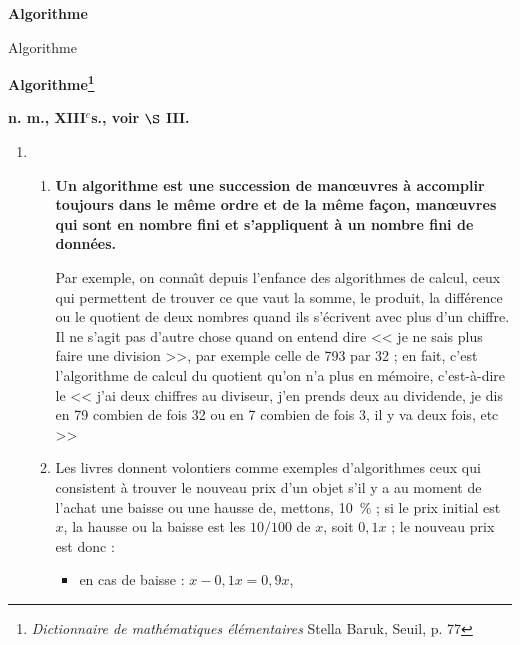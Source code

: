 \centerline{\Large\bf Algorithme} 
\addtocounter{section}{1}
 {Algorithme}
\label{Algo}

\noindent\hrulefill


{\Large \bf Algorithme\footnote{{\it Dictionnaire de math\'ematiques
\'el\'ementaires} Stella Baruk, {\sc Seuil}, p. 77}} \label{Algorithme}

{\bf n. m., XIII$^{e}$s., voir $\S$ III.}


\renewcommand{\theenumi}{\Roman{enumi}}
\begin{enumerate} 
\item \begin{enumerate} \item {\bf Un algorithme est une succession de 
       man{\oe}uvres \`a accomplir toujours dans le m\^eme ordre et de la m\^eme 
	   fa\c con, man{\oe}uvres qui sont en nombre fini et s'appliquent \`a un
	   nombre fini de donn\'ees.}

	   Par exemple, on conna\^\i t depuis l'enfance des algorithmes de calcul, 
	   ceux qui permettent de trouver ce que vaut la somme, le produit, la
	   diff\'erence ou le quotient de deux nombres quand ils s'\'ecrivent avec
	   plus d'un chiffre. Il ne s'agit pas d'autre chose quand on entend dire
	   << je ne sais plus faire une division >>, par exemple celle de 793 par
	   32 ; en fait, c'est l'algorithme de calcul du quotient qu'on n'a plus en
	   m\'emoire, c'est-\`a-dire le << j'ai deux chiffres au diviseur, j'en prends
	   deux au dividende, je dis en 79 combien de fois 32 ou en 7 combien de
	   fois 3, il y va deux fois, etc >>

	   \item Les livres donnent volontiers comme exemples d'algorithmes ceux
	   qui consistent \`a trouver le nouveau  prix d'un objet s'il y a au moment
	   de l'achat une baisse ou une hausse de, mettons, 10~\% ; si le prix
	   initial est $x$, la hausse ou la baisse est les $10/100$ de $x$, soit
	   $0,1x$ ; le nouveau prix est donc :

	   \begin{itemize} 
  
	   \item en cas de baisse : $x - 0,1x = 0,9x$,


\end{itemize}
\end{enumerate}
\end{enumerate}
